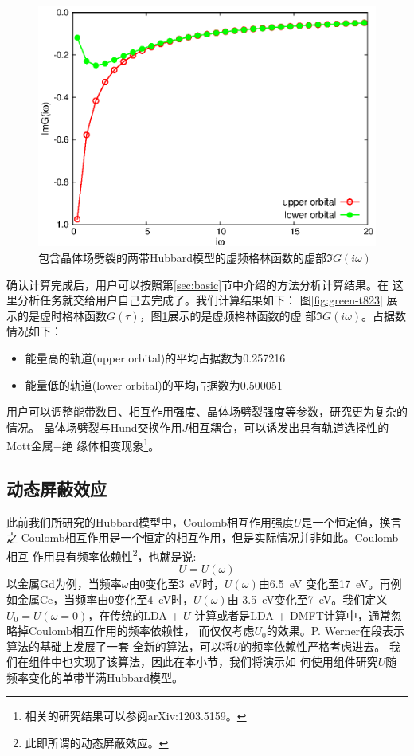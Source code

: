 \begin{figure}
\centering
\includegraphics{figure/grn-t823.eps}
\caption{包含晶体场劈裂的两带Hubbard模型的虚频格林函数的虚部$\Im G(i\omega)$} 
\label{fig:grn-t823}
\end{figure}

确认计算完成后，用户可以按照第\ref{sec:basic}节中介绍的方法分析计算结果。在
这里分析任务就交给用户自己去完成了。我们计算结果如下： 图\ref{fig:green-t823}
展示的是虚时格林函数$G(\tau)$，图\ref{fig:grn-t823}展示的是虚频格林函数的虚
部$\Im G(i\omega)$。占据数情况如下：
\begin{itemize}
\item 能量高的轨道(upper orbital)的平均占据数为0.257216
\item 能量低的轨道(lower orbital)的平均占据数为0.500051
\end{itemize}

用户可以调整能带数目、相互作用强度、晶体场劈裂强度等参数，研究更为复杂的情况。
晶体场劈裂与Hund交换作用$J$相互耦合，可以诱发出具有轨道选择性的Mott金属$-$绝
缘体相变现象\footnote{相关的研究结果可以参阅{\color{red}arXiv:1203.5159}。}。

\subsection{动态屏蔽效应}
\label{subsec:scr}

此前我们所研究的Hubbard模型中，Coulomb相互作用强度$U$是一个恒定值，换言之
Coulomb相互作用是一个恒定的相互作用，但是实际情况并非如此。Coulomb相互
作用具有频率依赖性\footnote{此即所谓的动态屏蔽效应。}，也就是说:
\begin{equation}
U = U(\omega)
\end{equation}
以金属Gd为例，当频率$\omega$由0变化至3\ eV时，$U(\omega)$由6.5\ eV
变化至17\ eV。再例如金属Ce，当频率由0变化至4\ eV时，$U(\omega)$由
3.5\ eV变化至7\ eV。我们定义$U_{0} = U(\omega = 0)$，在传统的LDA + $U$
计算或者是LDA + DMFT计算中，通常忽略掉Coulomb相互作用的频率依赖性，
而仅仅考虑$U_{0}$的效果。P. Werner在段表示算法的基础上发展了一套
全新的算法，可以将$U$的频率依赖性严格考虑进去\cite{werner:2010}。
我们在{\narcissus}组件中也实现了该算法，因此在本小节，我们将演示如
何使用{\narcissus}组件研究$U$随频率变化的单带半满Hubbard模型。

